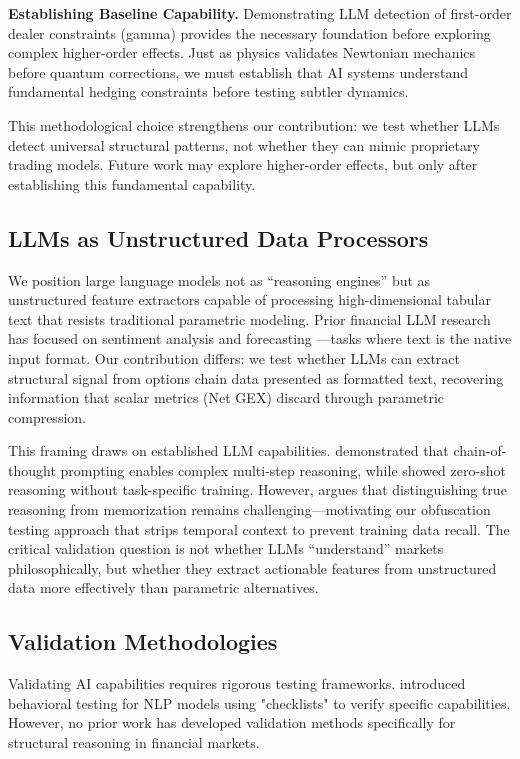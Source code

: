 \textbf{Establishing Baseline Capability.} Demonstrating LLM detection of first-order dealer constraints (gamma) provides the necessary foundation before exploring complex higher-order effects. Just as physics validates Newtonian mechanics before quantum corrections, we must establish that AI systems understand fundamental hedging constraints before testing subtler dynamics.

This methodological choice strengthens our contribution: we test whether LLMs detect universal structural patterns, not whether they can mimic proprietary trading models. Future work may explore higher-order effects, but only after establishing this fundamental capability.

\subsection{LLMs as Unstructured Data Processors}

We position large language models not as ``reasoning engines'' but as unstructured feature extractors capable of processing high-dimensional tabular text that resists traditional parametric modeling. Prior financial LLM research has focused on sentiment analysis and forecasting \citep{lopez2023can,wu2023bloomberggpt,chen2023fingpt}—tasks where text is the native input format. Our contribution differs: we test whether LLMs can extract structural signal from options chain data presented as formatted text, recovering information that scalar metrics (Net GEX) discard through parametric compression.

This framing draws on established LLM capabilities. \citet{wei2022chain} demonstrated that chain-of-thought prompting enables complex multi-step reasoning, while \citet{kojima2022large} showed zero-shot reasoning without task-specific training. However, \citet{marcus2019rebooting} argues that distinguishing true reasoning from memorization remains challenging—motivating our obfuscation testing approach that strips temporal context to prevent training data recall. The critical validation question is not whether LLMs ``understand'' markets philosophically, but whether they extract actionable features from unstructured data more effectively than parametric alternatives.

\subsection{Validation Methodologies}

Validating AI capabilities requires rigorous testing frameworks. \citet{ribeiro2020beyond} introduced behavioral testing for NLP models using "checklists" to verify specific capabilities. However, no prior work has developed validation methods specifically for structural reasoning in financial markets.

